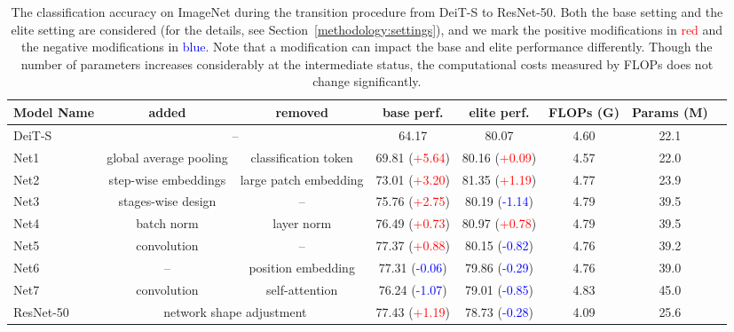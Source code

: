 \documentclass[10pt,twocolumn,letterpaper]{article}
\begin{document}
\begin{table*}
\begin{center}
\setlength{\tabcolsep}{0.12cm}
\begin{tabular}{|l|c|c|c|c|c|c|c|}
\hline
Model Name & \textbf{added} & \textbf{removed} & \textbf{base} perf. & \textbf{elite} perf. & FLOPs (G) & Params (M) \\
\hline\hline
DeiT-S & \multicolumn{2}{c|}{--} & 64.17 & 80.07 & 4.60 & 22.1\\
\hline
Net1 & global average pooling & classification token & 69.81 (\textcolor{red}{+5.64}) & 80.16 (\textcolor{red}{+0.09}) & 4.57 & 22.0 \\
Net2 & step-wise embeddings & large patch embedding & 73.01 (\textcolor{red}{+3.20}) & 81.35 (\textcolor{red}{+1.19}) & 4.77 & 23.9 \\
Net3 & stages-wise design & -- & 75.76 (\textcolor{red}{+2.75}) & 80.19 (\textcolor{blue}{-1.14}) & 4.79 &39.5\\
Net4 & batch norm & layer norm & 76.49 (\textcolor{red}{+0.73}) & 80.97 (\textcolor{red}{+0.78}) & 4.79 & 39.5\\
Net5 &  convolution & -- & 77.37 (\textcolor{red}{+0.88}) & 80.15 (\textcolor{blue}{-0.82}) &4.76 &39.2\\
Net6 & -- & position embedding & 77.31 (\textcolor{blue}{-0.06}) & 79.86 (\textcolor{blue}{-0.29}) & 4.76 & 39.0 \\
Net7 & convolution & self-attention & 76.24 (\textcolor{blue}{-1.07}) & 79.01 (\textcolor{blue}{-0.85}) & 4.83 & 45.0\\
\hline
ResNet-50 & \multicolumn{2}{c|}{network shape adjustment} & 77.43 (\textcolor{red}{+1.19}) & 78.73 (\textcolor{blue}{-0.28}) & 4.09 & 25.6\\
\hline
\end{tabular}
\end{center}
\caption{The classification accuracy on ImageNet during the transition procedure from DeiT-S to ResNet-50. Both the base setting and the elite setting are considered (for the details, see Section~\ref{methodology:settings}), and we mark the positive modifications in \textcolor{red}{red} and the negative modifications in \textcolor{blue}{blue}. Note that a modification can impact the base and elite performance differently. Though the number of parameters increases considerably at the intermediate status, the computational costs measured by FLOPs does not change significantly.}
\label{tab:transition}
\end{table*}
\end{document}
